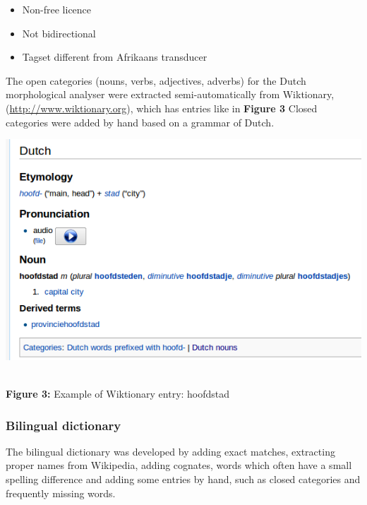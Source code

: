 \documentclass[a0,landscape]{a0poster}
\begin{document}
\begin{multicols}{4}
\begin{itemize}
 \item Non-free licence
 \item Not bidirectional
 \item Tagset different from Afrikaans transducer
\end{itemize}

\vspace{0.5cm}

\noindent
The open categories (nouns, verbs, adjectives, adverbs) for the Dutch 
morphological analyser were extracted semi-automatically from 
Wiktionary, (\url{http://www.wiktionary.org}), which has entries like in {\bf Figure 3}
Closed categories were added by hand based on a grammar of Dutch.
\vspace{0.5cm}

\begin{center}
\begin{minipage}[b]{26cm}
\includegraphics[width=260mm]{hoofdstad.png}
\end{minipage}\\
\textbf{Figure 3:} Example of Wiktionary entry: hoofdstad
\label{wikt1}
\vspace{0.3cm}
\end{center}


\vspace{0.5cm}

\subsubsection{Bilingual dictionary}

\noindent
The bilingual dictionary was developed by adding exact matches, extracting proper names
from Wikipedia, adding cognates, words which often have a small spelling difference and adding
some entries by hand, such as closed categories and frequently missing words.


\end{multicols}
\end{document}
